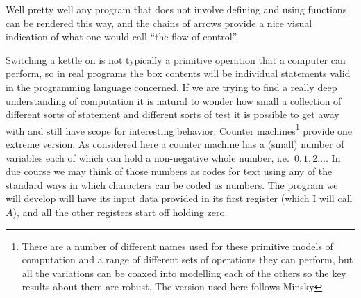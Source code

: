 Well pretty well any program that does not involve defining and using
functions can be rendered this way, and the chains of arrows provide a
nice visual indication of what one would call ``the flow of control''.

Switching a kettle on is not typically a primitive operation that a computer
can perform, so in real programs the box contents will be individual
statements valid in the programming language concerned. If we are trying to
find a really deep understanding of computation it is natural to wonder
how small a collection of different sorts of statement and different sorts
of test it is possible to get away with and still have scope for
interesting behavior. Counter machines\footnote{There are a number of
different names used for these primitive models of computation and a
range of different sets of operations they can perform, but all the
variations can be coaxed into modelling each of the others so the key
results about them are robust. The version used here follows
Minsky\cite{Minsky61}} provide one extreme version. As
considered here a counter machine has a (small) number of variables each
of which can hold a non-negative whole number, i.e.\ $0,1,2\ldots$.
In due course we may think of those numbers as codes for text using
any of the standard ways in which characters can be coded as numbers.
The program we will develop will have its input data provided in its
first register (which I will call $A$), and all the other registers start
off holding zero.

